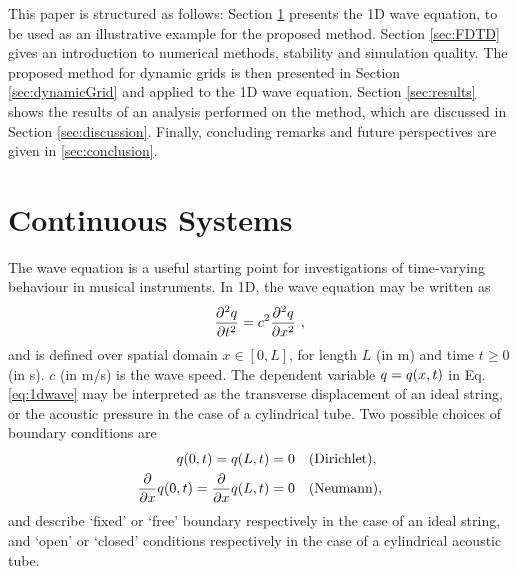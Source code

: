 
This paper is structured as follows: Section \ref{sec:continuous} presents the 1D wave equation, to be used as an illustrative example for the proposed method. Section \ref{sec:FDTD} gives an introduction to numerical methods, stability and simulation quality. The proposed method for dynamic grids is then presented in Section \ref{sec:dynamicGrid} and applied to the 1D wave equation. Section \ref{sec:results} shows the results of an analysis performed on the method, which are discussed in Section \ref{sec:discussion}. Finally, concluding remarks and future perspectives are given in \ref{sec:conclusion}.

\section{Continuous Systems}\label{sec:continuous}
%
%
%

The wave equation is a useful starting point for investigations of time-varying behaviour in musical instruments. In 1D, the wave equation may be written as
\begin{equation}\label{eq:1dwave}
    \frac{\partial^2 q}{\partial t^2}= c^2\frac{\partial^2 q}{\partial x^2}\ ,
\end{equation}
and is defined over spatial domain $x \in [0, L]$, for length $L$ (in m) and time $t \geq 0$ (in s). $c$ (in m/s) is the wave speed. The dependent variable $q = q(x,t)$ in Eq. \eqref{eq:1dwave} may be interpreted as the transverse displacement of an ideal string, or the acoustic pressure in the case of a cylindrical tube. Two possible choices of boundary conditions are
\begin{subequations}\label{eq:continuousBoundaries}
    \begin{align}
        q(0, t) = q(L, t) &= 0\quad \text{(Dirichlet)},\label{eq:contDirichlet}\\
        \frac{\partial}{\partial x} q(0, t) = \frac{\partial}{\partial x} q(L, t) &= 0\quad \text{(Neumann)},\label{eq:contNeumann}
    \end{align}
\end{subequations}
and describe `fixed' or `free' boundary respectively in the case of an ideal string, and `open' or `closed' conditions respectively in the case of a cylindrical acoustic tube.

